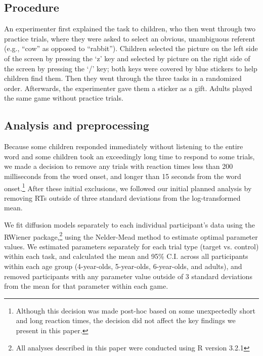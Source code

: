\documentclass[10pt,letterpaper]{article}
\begin{document}
\subsection{Procedure}

An experimenter first explained the task to children, who then went through two practice trials, where they were asked to select an obvious, unambiguous referent (e.g., ``cow'' as opposed to ``rabbit''). Children selected the picture on the left side of the screen by pressing the `z' key and selected by picture on the right side of the screen by pressing the `/' key; both keys were covered by blue stickers to help children find them. Then they went through the three tasks in a randomized order. Afterwards, the experimenter gave them a sticker as a gift. Adults played the same game without practice trials.



\subsection{Analysis and preprocessing}

Because some children responded immediately without listening to the entire word and some children took an exceedingly long time to respond to some trials, we made a decision to remove any trials with reaction times less than 200 milliseconds from the word onset, and longer than 15 seconds from the word onset.\footnote{Although this decision was made post-hoc based on some unexpectedly short and long reaction times, the decision did not affect the key findings we present in this paper.} After these initial exclusions, we followed our initial planned analysis by removing RTs outside of three standard deviations from the log-transformed mean.

We fit diffusion models separately to each individual participant's data using the RWiener package,\footnote{All analyses described in this paper were conducted using R version 3.2.1} using the Nelder-Mead method to estimate optimal parameter values. We estimated parameters separately for each trial type (target vs. control) within each task, and calculated the mean and 95\% C.I. across all participants within each age group (4-year-olds, 5-year-olds, 6-year-olds, and adults), and removed participants with any parameter value outside of 3 standard deviations from the mean for that parameter within each game.  
\end{document}
